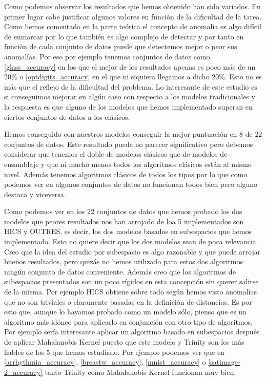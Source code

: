 Como podemos observar los resultados que hemos obtenido han sido variados. En primer lugar cabe justificar algunos valores en función de la dificultad de la tarea. Como hemos comentado en la parte teórica el concepto de anomalía es algo difícil de enmarcar por lo que también es algo complejo de detectar y por tanto en función de cada conjunto de datos puede que detectemos mejor o peor sus anomalías. Por eso por ejemplo tenemos conjuntos de datos como \ref{glass_accuracy} en los que el mejor de los resultados apenas es poco más de un 20\% o \ref{optdigits_accuracy} en el que ni siquiera llegamos a dicho 20\%. Esto no es más que el reflejo de la dificultad del problema. Lo interesante de este estudio es si conseguimos mejorar en algún caso con respecto a los modelos tradicionales y la respuesta es que alguno de los modelos que hemos implementado superan en ciertos conjuntos de datos a los clásicos.

Hemos conseguido con nuestros modelos conseguir la mejor puntuación en $8$ de $22$ conjuntos de datos. Este resultado puede no parecer significativo pero debemos considerar que tenemos el doble de modelos clásicos que de modelos de ensamblaje y que ni mucho menos todos los algoritmos clásicos están al mismo nivel. Además tenemos algoritmos clásicos de todos los tipos por lo que como podemos ver en algunos conjuntos de datos no funcionan todos bien pero alguno destaca y viceversa. 

Como podemos ver en los $22$ conjuntos de datos que hemos probado los dos modelos que peores resultados nos han arrojado de loa 5 implementados son HICS y OUTRES, es decir, los dos modelos basados en subespacios que hemos implementado. Esto no quiere decir que los dos modelos sean de poca relevancia. Creo que la idea del estudio por subespacio es algo razonable y que puede arrojar buenos resultados, pero quizás no hemos utilizado para estos dos algoritmos ningún conjunto de datos conveniente. Además creo que los algoritmos de subespacios presentados son un poco rígidos en esta concepción sin querer salirse de la misma. Por ejemplo HICS obtiene sobre todo según hemos  visto anomalías que no son triviales o claramente basadas en la definición de distancias. Es por esto que, aunque lo hayamos probado como un modelo sólo, pienso que es un algoritmo más idóneo para aplicarlo en conjunción con otro tipo de algoritmos. Por ejemplo sería interesante aplicar un algoritmo basado en subespacios después de aplicar Mahalanobis Kernel puesto que este modelo y Trinity son los más fiables de los 5 que hemos estudiado. Por ejemplo podemos ver que en \ref{arrhythmia_accuracy}, \ref{breastw_accuracy}, \ref{mnist_accuracy} o \ref{satimage-2_accuracy} tanto Trinity como Mahalanobis Kernel funcionan muy bien. 

